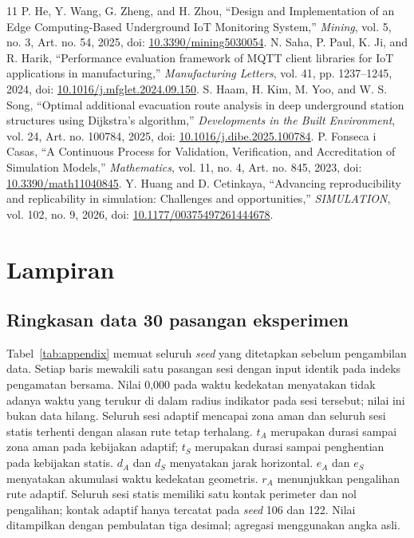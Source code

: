 \documentclass[10pt,a4paper]{article}
\begin{document}
\begin{thebibliography}{11}
 P. He, Y. Wang, G. Zheng, and H. Zhou, ``Design and Implementation of an Edge Computing-Based Underground IoT Monitoring System,'' \emph{Mining}, vol. 5, no. 3, Art. no. 54, 2025, doi: \href{https://doi.org/10.3390/mining5030054}{10.3390/mining5030054}.
 N. Saha, P. Paul, K. Ji, and R. Harik, ``Performance evaluation framework of MQTT client libraries for IoT applications in manufacturing,'' \emph{Manufacturing Letters}, vol. 41, pp. 1237--1245, 2024, doi: \href{https://doi.org/10.1016/j.mfglet.2024.09.150}{10.1016/j.mfglet.2024.09.150}.
 S. Haam, H. Kim, M. Yoo, and W. S. Song, ``Optimal additional evacuation route analysis in deep underground station structures using Dijkstra's algorithm,'' \emph{Developments in the Built Environment}, vol. 24, Art. no. 100784, 2025, doi: \href{https://doi.org/10.1016/j.dibe.2025.100784}{10.1016/j.dibe.2025.100784}.
 P. Fonseca i Casas, ``A Continuous Process for Validation, Verification, and Accreditation of Simulation Models,'' \emph{Mathematics}, vol. 11, no. 4, Art. no. 845, 2023, doi: \href{https://doi.org/10.3390/math11040845}{10.3390/math11040845}.
 Y. Huang and D. Cetinkaya, ``Advancing reproducibility and replicability in simulation: Challenges and opportunities,'' \emph{SIMULATION}, vol. 102, no. 9, 2026, doi: \href{https://doi.org/10.1177/00375497261444678}{10.1177/00375497261444678}.
\end{thebibliography}

\clearpage
\section*{Lampiran}
\subsection*{Ringkasan data 30 pasangan eksperimen}
Tabel~\ref{tab:appendix} memuat seluruh \emph{seed} yang ditetapkan sebelum pengambilan data. Setiap baris mewakili satu pasangan sesi dengan input identik pada indeks pengamatan bersama. Nilai 0,000 pada waktu kedekatan menyatakan tidak adanya waktu yang terukur di dalam radius indikator pada sesi tersebut; nilai ini bukan data hilang. Seluruh sesi adaptif mencapai zona aman dan seluruh sesi statis terhenti dengan alasan rute tetap terhalang. $t_A$ merupakan durasi sampai zona aman pada kebijakan adaptif; $t_S$ merupakan durasi sampai penghentian pada kebijakan statis. $d_A$ dan $d_S$ menyatakan jarak horizontal. $e_A$ dan $e_S$ menyatakan akumulasi waktu kedekatan geometris. $r_A$ menunjukkan pengalihan rute adaptif. Seluruh sesi statis memiliki satu kontak perimeter dan nol pengalihan; kontak adaptif hanya tercatat pada \emph{seed} 106 dan 122. Nilai ditampilkan dengan pembulatan tiga desimal; agregasi menggunakan angka asli.
\end{document}
